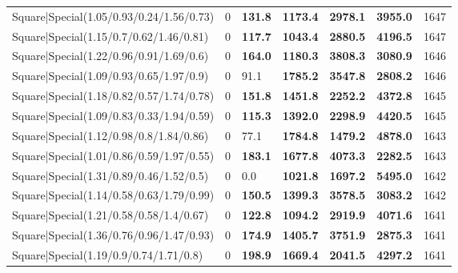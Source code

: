 \begin{tabular}{lrllllr}
 Square|Special(1.05/0.93/0.24/1.56/0.73)                      &             0   & \textbf{131.8} & \textbf{1173.4} & \textbf{2978.1} & \textbf{3955.0} &         1647 \\
 Square|Special(1.15/0.7/0.62/1.46/0.81)                       &             0   & \textbf{117.7} & \textbf{1043.4} & \textbf{2880.5} & \textbf{4196.5} &         1647 \\
 Square|Special(1.22/0.96/0.91/1.69/0.6)                       &             0   & \textbf{164.0} & \textbf{1180.3} & \textbf{3808.3} & \textbf{3080.9} &         1646 \\
 Square|Special(1.09/0.93/0.65/1.97/0.9)                       &             0   & 91.1           & \textbf{1785.2} & \textbf{3547.8} & \textbf{2808.2} &         1646 \\
 Square|Special(1.18/0.82/0.57/1.74/0.78)                      &             0   & \textbf{151.8} & \textbf{1451.8} & \textbf{2252.2} & \textbf{4372.8} &         1645 \\
 Square|Special(1.09/0.83/0.33/1.94/0.59)                      &             0   & \textbf{115.3} & \textbf{1392.0} & \textbf{2298.9} & \textbf{4420.5} &         1645 \\
 Square|Special(1.12/0.98/0.8/1.84/0.86)                       &             0   & 77.1           & \textbf{1784.8} & \textbf{1479.2} & \textbf{4878.0} &         1643 \\
 Square|Special(1.01/0.86/0.59/1.97/0.55)                      &             0   & \textbf{183.1} & \textbf{1677.8} & \textbf{4073.3} & \textbf{2282.5} &         1643 \\
 Square|Special(1.31/0.89/0.46/1.52/0.5)                       &             0   & 0.0            & \textbf{1021.8} & \textbf{1697.2} & \textbf{5495.0} &         1642 \\
 Square|Special(1.14/0.58/0.63/1.79/0.99)                      &             0   & \textbf{150.5} & \textbf{1399.3} & \textbf{3578.5} & \textbf{3083.2} &         1642 \\
 Square|Special(1.21/0.58/0.58/1.4/0.67)                       &             0   & \textbf{122.8} & \textbf{1094.2} & \textbf{2919.9} & \textbf{4071.6} &         1641 \\
 Square|Special(1.36/0.76/0.96/1.47/0.93)                      &             0   & \textbf{174.9} & \textbf{1405.7} & \textbf{3751.9} & \textbf{2875.3} &         1641 \\
 Square|Special(1.19/0.9/0.74/1.71/0.8)                        &             0   & \textbf{198.9} & \textbf{1669.4} & \textbf{2041.5} & \textbf{4297.2} &         1641 \\

\end{tabular}
